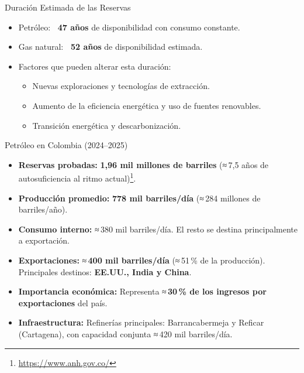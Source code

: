 \documentclass[main.tex]{subfiles}
\begin{document}
\begin{frame}{Duración Estimada de las Reservas}
    \begin{itemize}
        \item Petróleo: \textbf{~47 años} de disponibilidad con consumo constante.
        \item Gas natural: \textbf{~52 años} de disponibilidad estimada.
        \item Factores que pueden alterar esta duración:
        \begin{itemize}
            \item Nuevas exploraciones y tecnologías de extracción.
            \item Aumento de la eficiencia energética y uso de fuentes renovables.
            \item Transición energética y descarbonización.
        \end{itemize}
    \end{itemize}
\end{frame}

\begin{frame}{Petróleo en Colombia (2024–2025)}
    \small
    \begin{itemize}
        \item \textbf{Reservas probadas:} \textbf{1,96 mil millones de barriles}  
        (≈ 7,5 años de autosuficiencia al ritmo actual)\footnote{\url{https://www.anh.gov.co/}}.

        \item \textbf{Producción promedio:} \textbf{778 mil barriles/día}  
        (≈ 284 millones de barriles/año).

        \item \textbf{Consumo interno:} ≈ 380 mil barriles/día.  
        El resto se destina principalmente a exportación.

        \item \textbf{Exportaciones:}  
        ≈ \textbf{400 mil barriles/día} (≈ 51\,\% de la producción).  
        Principales destinos: \textbf{EE.UU., India y China}.

        \item \textbf{Importancia económica:}  
        Representa ≈ \textbf{30\,\% de los ingresos por exportaciones} del país.

        \item \textbf{Infraestructura:}  
        Refinerías principales: Barrancabermeja y Reficar (Cartagena), con capacidad conjunta ≈ 420 mil barriles/día.
    \end{itemize}
\end{frame}
\end{document}
